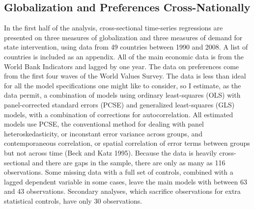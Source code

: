 \documentclass[12pt]{report}
\begin{document}
\subsection{Globalization and Preferences Cross-Nationally}
	In the first half of the analysis, cross-sectional time-series regressions are presented on three measures of globalization and three measures of demand for state intervention, using data from 49 countries between 1990 and 2008. A list of countries is included as an appendix. All of the main economic data is from the World Bank Indicators and lagged by one year.  The data on preferences come from the first four waves of the World Values Survey. The data is less than ideal for all the model specifications one might like to consider, so I estimate, as the data permit, a combination of models using ordinary least-squares (OLS) with panel-corrected standard errors (PCSE) and generalized least-squares (GLS) models, with a combination of corrections for autocorrelation. All estimated models use PCSE, the conventional method for dealing with panel heteroskedasticity, or inconstant error variance across groups, and contemporaneous correlation, or spatial correlation of error terms between groups but not across time (Beck and Katz 1995). Because the data is heavily cross-sectional and there are gaps in the sample, there are only as many as 116 observations. Some missing data with a full set of controls, combined with a lagged dependent variable in some cases, leave the main models with between 63 and 43 observations. Secondary analyses, which sacrifice observations for extra statistical controls, have only 30 observations.
	
\end{document}
